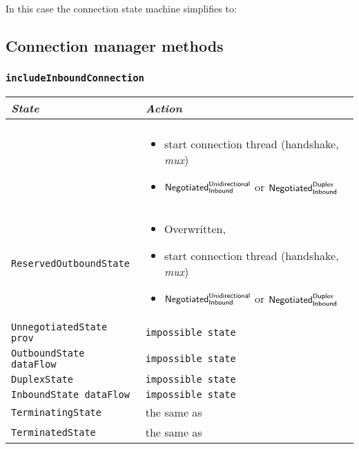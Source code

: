 \documentclass{article}
\def\InitialState{\textbullet}
\def\ReservedOutboundState{\texttt{ReservedOutboundState}}
\def\UnnegotiatedStateAny{\texttt{UnnegotiatedState prov}}
\def\OutboundStateAny{\texttt{OutboundState dataFlow}}
\def\DuplexState{\texttt{DuplexState}}
\def\InboundStateAny{\texttt{InboundState dataFlow}}
\def\TerminatingState{\texttt{TerminatingState}}
\def\TerminatedState{\texttt{TerminatedState}}
\def\Overwritten{\textsf{Overwritten}}
\def\NegotiatedUniIn{$\text{\textsf{Negotiated}}^\text{\textsf{Unidirectional}}_\text{\textsf{Inbound}}$}
\def\NegotiatedDupIn{$\text{\textsf{Negotiated}}^\text{\textsf{Duplex}}_\text{\textsf{Inbound}}$}
\def\mux{\textit{mux}}
\begin{document}
In this case the connection state machine simplifies to:

\subsection{Connection manager methods}
\subsubsection{\texttt{includeInboundConnection}}
\begin{center}
  \begin{tabular}[h]{ll}
    \textit{State}           & \textit{Action} \\\hline\\[2pt]
    \InitialState{}          &
      \begin{minipage}[t]{8cm}
        \begin{itemize}
          \item start connection thread (handshake, \mux{})
          \item \NegotiatedUniIn{} or \NegotiatedDupIn{}
        \end{itemize}
      \end{minipage}
      \vspace{8pt}\\
    \ReservedOutboundState{} &
      \begin{minipage}[t]{8cm}
        \begin{itemize}
          \item \Overwritten{},
          \item start connection thread (handshake, \mux{})
          \item \NegotiatedUniIn{} or \NegotiatedDupIn{}
        \end{itemize}
      \end{minipage}
      \vspace{8pt}\\
    \UnnegotiatedStateAny{}  & \texttt{impossible state} \\[8pt]
    \OutboundStateAny{}      & \texttt{impossible state} \\[8pt]
    \DuplexState{}           & \texttt{impossible state} \\[8pt]
    \InboundStateAny{}       & \texttt{impossible state} \\[8pt]
    \TerminatingState{}      & the same as \InitialState{} \\[8pt]
    \TerminatedState{}       & the same as \InitialState{} \\[8pt]
  \end{tabular}
\end{center}
\end{document}
